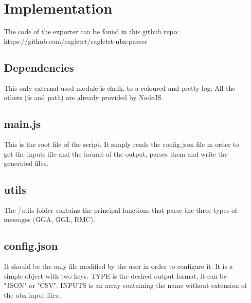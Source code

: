 \section{\huge{Implementation}}
The code of the exporter can be found in this github repo: https://github.com/eagletrt/eagletrt-ubx-parser

\subsection{Dependencies}
This only external used module is chalk, to a coloured and pretty log. All the others (fs and path) are already provided
by NodeJS.

\subsection{main.js}
This is the root file of the script. It simply reads the config.json file in order to get the inputs file and the format of the
output, parses them and write the generated files.

\subsection{utils}
The /utils folder contains the principal functions that parse the three types of messages (GGA, GGL, RMC).

\subsection{config.json}
It should be the only file modified by the user in order to configure it. It is a simple object with two keys. TYPE is the
desired output format, it can be "JSON" or "CSV". INPUTS is an array containing the name without extension of the ubx input
files.
